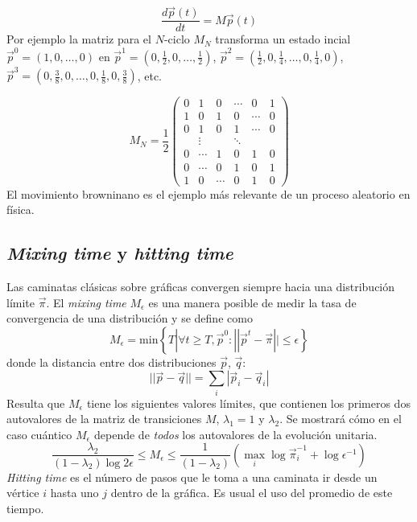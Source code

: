 \begin{equation}
    \dfrac{d\Vec{p}(t)}{dt}=M\Vec{p}(t)
\end{equation}{}
Por ejemplo la matriz para el $N$-ciclo $M_N$ transforma un estado incial $\Vec{p}^0=(1,0,\dots,0)$ en $\Vec{p}^1=(0,\frac{1}{2},0,\dots,\frac{1}{2})$, $\Vec{p}^2=(\frac{1}{2},0,\frac{1}{4},\dots,0,\frac{1}{4},0)$, $\Vec{p}^3=(0,\frac{3}{8},0,\dots,0,\frac{1}{8},0,\frac{3}{8})$, etc.

\begin{equation*}
    M_N=\dfrac{1}{2}
    \begin{pmatrix}
    0& 1& 0& \cdots& 0 &1 \\
    1& 0& 1& 0& \cdots& 0\\
    0& 1& 0& 1& \cdots& 0\\
    &\vdots & &\ddots & & \\
    0& \cdots & 1 &0 &1 &0 \\
    0& \cdots&0 &1 &0 &1 \\
    1& 0& \cdots&0 &1 &0
    \end{pmatrix}{}
\end{equation*}{}
El movimiento browninano es el ejemplo más relevante de un proceso aleatorio en física.

\subsection{\textit{Mixing time} y \textit{hitting time}}

Las caminatas clásicas sobre gráficas convergen siempre hacia una distribución límite $\Vec{\pi}$. El \textit{mixing time} $M_\epsilon$ es una manera posible de medir la tasa de convergencia de una distribución y se define como
\begin{equation*}
    M_\epsilon=\text{min}\left\{T|\forall t \geq T,\Vec{p}^0:||\Vec{p}^{t}-\Vec{\pi}||\leq\epsilon\right\}
\end{equation*}{}
donde la distancia entre dos distribuciones $\Vec{p}$, $\Vec{q}$:
\begin{equation}
    ||\Vec{p}-\Vec{q}||=\sum_i|\Vec{p}_i-\Vec{q}_i|
\end{equation}{}
Resulta que $M_\epsilon$ tiene los siguientes valores límites, que contienen los primeros dos autovalores de la matriz de transiciones $M$, $\lambda_1=1$ y $\lambda_2$. Se mostrará cómo en el caso cuántico $M_\epsilon$ depende de \textit{todos} los autovalores de la evolución unitaria.
\begin{equation*}{}
\dfrac{\lambda_2}{(1-\lambda_2)\log2\epsilon}\leq M_\epsilon\leq\dfrac{1}{(1-\lambda_2)}(\max_i\log\Vec{\pi}_i^{-1}+\log\epsilon^{-1})
\end{equation*}
\textit{Hitting time} es el número de pasos que le toma a una caminata ir desde un vértice $i$ hasta uno $j$ dentro de la gráfica. Es usual el uso del promedio de este tiempo.\\

